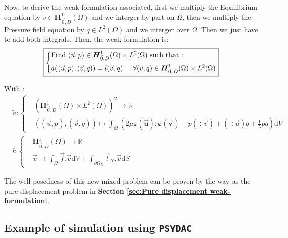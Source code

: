 \documentclass[a4paper,12pt,twoside]{report}
\newcommand{\mtr}{\mathbb{R}}
\newcommand{\dif}{\mathrm{d}}
\begin{document}
Now, to derive the weak formulation associated, first we multiply the Equilibrium equation by $v \in \boldsymbol H^1_{\vec 0,D}(\Omega)$ and we interger by part on $\Omega$, then we multiply the Pressure field equation by $q \in L^2(\Omega)$ and we interger over $\Omega$. Then we just have to add both integrals. 
Then, the weak formulation is: 
\begin{equation}
	\label{eq:weak_pressure_displ_form}
	\boxed{
		\left\{
		\begin{aligned}
			&\text{Find } (\vec u,p) \in \boldsymbol H^1_{\vec 0,D}(\Omega) \times L^2(\Omega) \text{ such that :}\\
			& \tilde{a}((\vec u,p),(\vec v,q)) = l(\vec v,q) \hspace{0.5cm} \forall (\vec v,q) \in \boldsymbol H^1_{\vec 0,D}(\Omega) \times L^2(\Omega)
		\end{aligned}
		\right.
	}
\end{equation}

With : 
\begin{equation*}
	\begin{aligned}
		& \tilde{a} : \left\{
		\begin{aligned}
			&\left( \boldsymbol H^1_{\vec 0,D}(\Omega) \times L^2(\Omega) \right)^2 \rightarrow \mtr \\
			&((\vec u,p),(\vec v,q))  \longmapsto \int_\Omega \left( 2\mu \boldsymbol{\varepsilon(\vec u)} : \boldsymbol{\varepsilon(\vec v)} - p (\div \vec v) + (\div \vec u)q + \frac{1}{\lambda} pq \right) \dif V
		\end{aligned}
		\right. \\[0.3cm]
		& l : \left\{
		\begin{aligned}
			&\boldsymbol H^1_{\vec 0,D}(\Omega) \rightarrow \mtr \\
			&\vec v \longmapsto \int_\Omega \vec f . \vec v \dif V + \int_{\partial\Omega_N} \vec t_N.\vec v \dif S
		\end{aligned}
		\right.
	\end{aligned}
\end{equation*}

The well-posedness of this new mixed-problem can be proven by the way as the pure displacement problem in \textbf{Section \ref{sec:Pure displacement weak-formulation}}.

\subsection{Example of simulation using \texttt{PSYDAC}}
\end{document}

